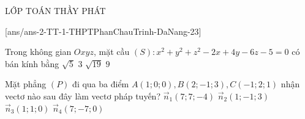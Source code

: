 \begin{name}
	{\tenchude}{\tendethi}{LỚP TOÁN THẦY PHÁT}{\thoigian}
\end{name}
[ans/ans-2-TT-1-THPTPhanChauTrinh-DaNang-23]
\setcounter{ex}{0}\setcounter{bt}{0}
\begin{ex}%
	Trong không gian $Oxyz$, mặt cầu $(S)\colon x^2+y^2+z^2-2x+4y-6z-5=0$ có bán kính bằng 
	\choice
	{$\sqrt{5}$}
	{$3$}
	{\True $\sqrt{19}$}
	{$9$}
\end{ex}
\begin{ex}%
	Mặt phẳng $(P)$ đi qua ba điểm $A(1; 0; 0), B(2;-1; 3), C(-1; 2; 1)$ nhận vectơ nào sau đây làm vectơ pháp tuyến?
	\choice
	{$\vec{n}_1(7; 7;-4)$}
	{$\vec{n}_2(1;-1; 3)$}
	{\True $\vec{n}_3(1; 1; 0)$}
	{$\vec{n}_4(7;-7; 0)$}
\end{ex}

